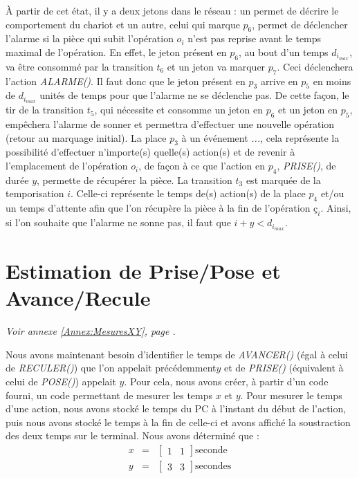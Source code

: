 À partir de cet état, il y a deux jetons dans le réseau : un permet de décrire le comportement du chariot et un autre, celui qui marque $p_6$, permet de déclencher l'alarme si la pièce qui subit l'opération $o_i$ n'est pas reprise avant le temps maximal de l'opération.  En effet, le jeton présent en $p_6$, au bout d'un temps $d_{i_{max}}$, va être consommé par la transition $t_6$ et un jeton va marquer $p_7$. Ceci déclenchera l'action \emph{ALARME()}.
Il faut donc que le jeton présent en $p_3$ arrive en $p_5$ en moins de $d_{i_{max}}$ unités de temps pour que l'alarme ne se déclenche pas. De cette façon, le tir de la transition $t_5$, qui nécessite et consomme un jeton en $p_6$ et un jeton en $p_5$, empêchera l'alarme de sonner et permettra d'effectuer une nouvelle opération (retour au marquage initial). 
La place $p_3$ à un événement \emph{...}, cela représente la possibilité d'effectuer n'importe(s) quelle(s) action(s) et de revenir à l'emplacement de l'opération $o_i$, de façon à ce que l'action en $p_4$, \emph{PRISE()}, de durée $y$, permette de récupérer la pièce. La transition $t_3$ est marquée de la temporisation $i$. Celle-ci représente le temps de(s) action(s) de la place $p_4$ et/ou un temps d'attente afin que l'on récupère la pièce à la fin de l'opération $ç_i$. Ainsi, si l'on souhaite que l'alarme ne sonne pas, il faut que $i + y < d_{i_{max}}$.

\section{Estimation de Prise/Pose et Avance/Recule}
\begin{center}
\textit{Voir annexe \ref{Annex:MesuresXY}, page \pageref{Annex:MesuresXY}.}
\end{center}
Nous avons maintenant besoin d'identifier le temps de \emph{AVANCER()} (égal à celui de \emph{RECULER()}) que l'on appelait précédemment$y$  et de \emph{PRISE()} (équivalent à celui de \emph{POSE()}) appelait $y$. Pour cela, nous avons créer, à partir d'un code fourni, un code permettant de mesurer les temps $x$ et $y$. Pour mesurer le temps d'une action, nous avons stocké le temps du PC à l'instant du début de l'action, puis nous avons stocké le temps à la fin de celle-ci et avons affiché la soustraction des deux temps sur le terminal. 
Nous avons déterminé que :
\begin{eqnarray}
x &=& \begin{bmatrix}
1 & 1
\end{bmatrix} \text{seconde}\\
y &=& \begin{bmatrix}
3 & 3
\end{bmatrix} \text{secondes}\\
\end{eqnarray}
